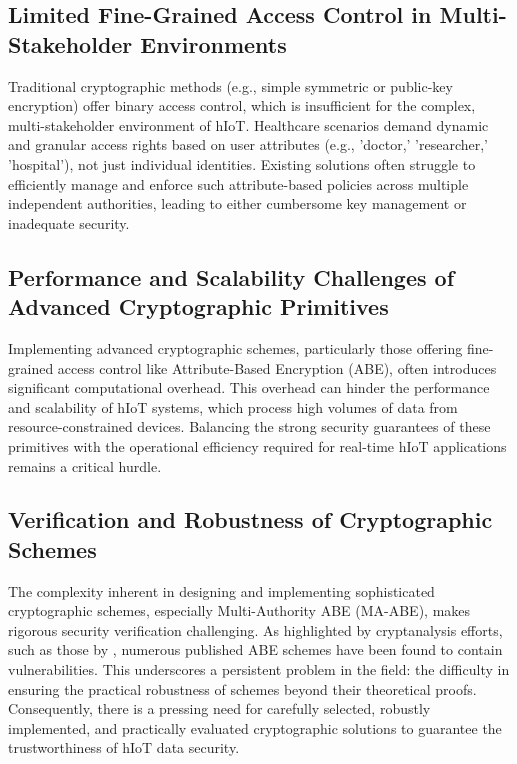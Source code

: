 \documentclass[cic,tc,english]{iiufrgs}
\begin{document}
        \subsection{Limited Fine-Grained Access Control in Multi-Stakeholder Environments}
            Traditional cryptographic methods (e.g., simple symmetric or public-key encryption) offer binary access control, which is insufficient for the complex, multi-stakeholder environment of hIoT. Healthcare scenarios demand dynamic and granular access rights based on user attributes (e.g., 'doctor,' 'researcher,' 'hospital'), not just individual identities. Existing solutions often struggle to efficiently manage and enforce such attribute-based policies across multiple independent authorities, leading to either cumbersome key management or inadequate security.

        \subsection{Performance and Scalability Challenges of Advanced Cryptographic Primitives}
            Implementing advanced cryptographic schemes, particularly those offering fine-grained access control like Attribute-Based Encryption (ABE), often introduces significant computational overhead. This overhead can hinder the performance and scalability of hIoT systems, which process high volumes of data from resource-constrained devices. Balancing the strong security guarantees of these primitives with the operational efficiency required for real-time hIoT applications remains a critical hurdle.

        \subsection{Verification and Robustness of Cryptographic Schemes}
            The complexity inherent in designing and implementing sophisticated cryptographic schemes, especially Multi-Authority ABE (MA-ABE), makes rigorous security verification challenging. As highlighted by cryptanalysis efforts, such as those by \citet{broken2020}, numerous published ABE schemes have been found to contain vulnerabilities. This underscores a persistent problem in the field: the difficulty in ensuring the practical robustness of schemes beyond their theoretical proofs. Consequently, there is a pressing need for carefully selected, robustly implemented, and practically evaluated cryptographic solutions to guarantee the trustworthiness of hIoT data security.
\end{document}
